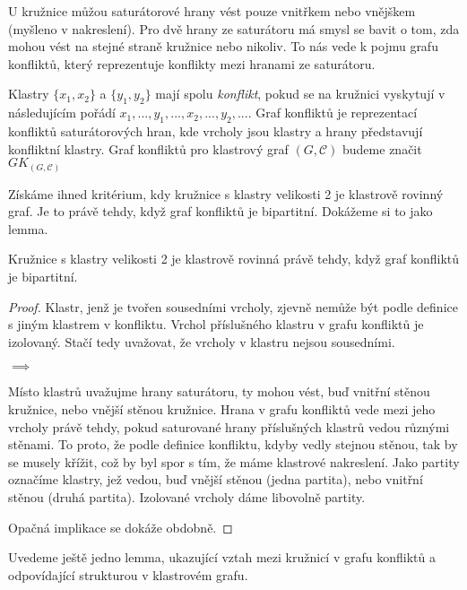 U kružnice můžou saturátorové hrany vést pouze vnitřkem nebo vnějškem (myšleno v nakreslení). Pro dvě hrany ze saturátoru má smysl se bavit o tom, zda mohou vést na stejné straně kružnice nebo nikoliv. To nás vede k pojmu grafu konfliktů, který reprezentuje konflikty mezi hranami ze saturátoru. 

\begin{defn}
 Klastry $\{x_1, x_2\}$ a $\{y_1, y_2\}$ mají spolu \textit{konflikt}, pokud se na kružnici vyskytují v následujícím pořádí $x_1 , ..., y_1, ..., x_2, ..., y_2, ...$. Graf konfliktů je reprezentací konfliktů saturátorových hran, kde vrcholy jsou klastry a hrany představují konfliktní klastry. Graf konfliktů pro klastrový graf $(G,\mathcal C)$ budeme značit $GK_{(G,\mathcal C)}$
\end{defn}

Získáme ihned kritérium, kdy kružnice s klastry velikosti 2 je klastrově rovinný graf. Je to právě tehdy, když graf konfliktů je bipartitní. Dokážeme si to jako lemma.

\begin{lemma}\label{lemma_ekv_graf_konf_kl_rov}Kružnice s klastry velikosti 2 je klastrově rovinná právě tehdy, když graf konfliktů je bipartitní.
\end{lemma}
\begin{proof}
Klastr, jenž je tvořen sousedními vrcholy, zjevně nemůže být podle definice s jiným klastrem v konfliktu. Vrchol příslušného klastru v grafu konfliktů je izolovaný. Stačí tedy uvažovat, že vrcholy v klastru nejsou sousedními.

$\implies$

Místo klastrů uvažujme hrany saturátoru, ty mohou vést, buď vnitřní stěnou kružnice, nebo vnější stěnou kružnice. Hrana v grafu konfliktů vede mezi jeho vrcholy právě tehdy, pokud saturované hrany příslušných klastrů vedou různými stěnami. To proto, že podle definice konfliktu, kdyby vedly stejnou stěnou, tak by se musely křížit, což by byl spor s tím, že máme klastrové nakreslení. Jako partity označíme klastry, jež vedou, buď vnější stěnou (jedna partita), nebo vnitřní stěnou (druhá partita). Izolované vrcholy dáme libovolně partity.

Opačná implikace se dokáže obdobně.
\end{proof}

Uvedeme ještě jedno lemma, ukazující vztah mezi kružnicí v grafu konfliktů a odpovídající strukturou v klastrovém grafu.

